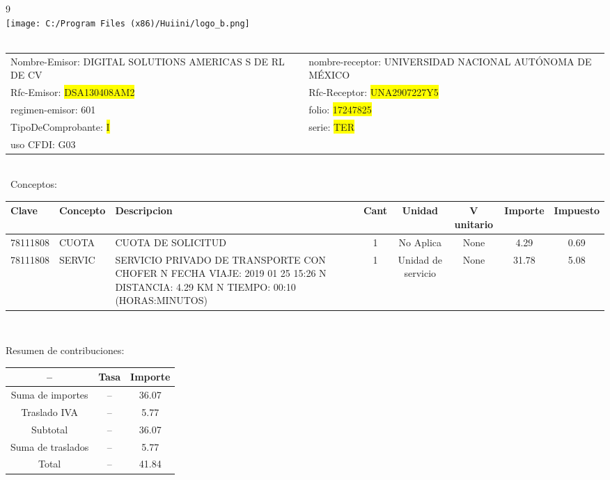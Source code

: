 \documentclass{article}
\begin{document}
\hspace{18cm} 9\\
\texttt{[image: C:/Program Files (x86)/Huiini/logo\_b.png]}
\bigskip\\\
\begin{tabular}{p{11cm}p{1cm}p{8cm}}

Nombre-Emisor: DIGITAL SOLUTIONS AMERICAS S DE RL DE CV && nombre-receptor: UNIVERSIDAD NACIONAL AUTÓNOMA DE MÉXICO\\

Rfc-Emisor: \colorbox{yellow}{ DSA130408AM2 } & & Rfc-Receptor: \colorbox{yellow}{ UNA2907227Y5 }\\

regimen-emisor: 601 & & folio: \colorbox{yellow}{ 17247825 }\\

TipoDeComprobante: \colorbox{yellow}{ I } & & serie: \colorbox{yellow}{ TER }\\

uso CFDI: G03\\



\end{tabular}
\bigskip\bigskip\bigskip\\\
Conceptos:\\
\begin{tabular}{|p{1.5cm}|p{3.6cm}|p{3.6cm}|c|c|c|c|c|}
\hline
Clave & Concepto & Descripcion & Cant & Unidad & V unitario & Importe & Impuesto \\
\hline

78111808 & CUOTA  & CUOTA DE SOLICITUD & 1 & No Aplica & None & 4.29 &  0.69 \\
\hline

78111808 & SERVIC & SERVICIO PRIVADO DE TRANSPORTE CON CHOFER  N FECHA VIAJE: 2019 01 25 15:26  N DISTANCIA: 4.29 KM  N TIEMPO: 00:10 (HORAS:MINUTOS) & 1 & Unidad de servicio & None & 31.78 &  5.08 \\
\hline

\end{tabular}\\
\bigskip
\begin{center}
Resumen de contribuciones:\\
\bigskip
\begin{tabular}{|c|c|c|}
\hline
 -- & Tasa & Importe\\
\hline

Suma de importes & -- & 36.07 \\
\hline

Traslado IVA & -- & 5.77 \\
\hline

Subtotal  & -- & 36.07 \\
\hline

Suma de traslados & -- & 5.77 \\
\hline

Total  & -- & 41.84 \\
\hline

\end{tabular}
\end{center}
\end{document}
